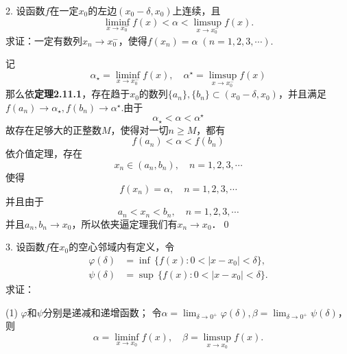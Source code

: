 2. 设函数$f$在一定$x_0$的左边$(x_0-\delta,x_0)$上连续，且
\begin{equation*}
    \liminf_{x \to x_0^-} f(x) < \alpha < \limsup_{x \to x_0^-} f(x).
\end{equation*}
求证：一定有数列$x_n \to x_0^-$，使得$f(x_n)=\alpha \; (n=1,2,3,\cdots)$.

\prove 记
\begin{equation}
    \alpha_\star = \liminf_{x \to x_0^-} f(x), \quad \alpha^\star = \limsup_{x \to x_0^-} f(x)
\end{equation}
那么依\textbf{定理2.11.1}，存在趋于$x_0$的数列$\{ a_n \}, \{ b_n \} \subset (x_0 - \delta, x_0)$，并且满足$f(a_n) \to \alpha_\star, f(b_n) \to \alpha^\star$.由于
\begin{equation}
    \alpha_\star < \alpha < \alpha^\star
\end{equation}
故存在足够大的正整数$M$，使得对一切$n \geq M$，都有
\begin{equation}
    f(a_n) < \alpha < f(b_n)
\end{equation}
依介值定理，存在
\begin{equation}
    x_n \in (a_n, b_n), \quad n = 1,2,3,\cdots
\end{equation}
使得
\begin{equation}
    f(x_n) = \alpha, \quad n = 1,2,3,\cdots
\end{equation}
并且由于
\begin{equation}
    a_n < x_n < b_n, \quad n = 1,2,3,\cdots
\end{equation}
并且$a_n, b_n \to x_0$，所以依夹逼定理我们有$x_n \to x_0$．\qed\bigskip

3. 设函数$f$在$x_0$的空心邻域内有定义，令
\begin{align*}
    \varphi\left(\delta\right) &= \inf \, \{ f(x) : 0 < \lvert x - x_0 \rvert < \delta \}, \\
    \psi\left(\delta\right) &= \sup \, \{ f(x) : 0 < \lvert x - x_0 \rvert < \delta \} .
\end{align*}
求证：
\begin{tasks}(1)
    \task $\varphi$和$\psi$分别是递减和递增函数；
    \task 令$\alpha = \displaystyle\lim_{\delta \to 0^+} \varphi (\delta), \beta = \displaystyle\lim_{\delta \to 0^+} \psi(\delta)$，则
    \begin{equation*}
        \alpha = \liminf_{x \to x_0} f(x), \quad \beta = \limsup_{x \to x_0} f(x).
    \end{equation*}
\end{tasks}

